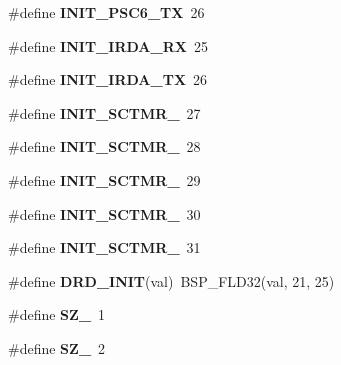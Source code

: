 \begin{DoxyCompactItemize}
\#define {\bfseries I\+N\+I\+T\+\_\+\+P\+S\+C6\+\_\+\+TX}~26
\item 
\mbox{\label{group__BestCommOps_ga1b7d0e7b2c654806151149a79e3caad8}} 
\#define {\bfseries I\+N\+I\+T\+\_\+\+I\+R\+D\+A\+\_\+\+RX}~25
\item 
\mbox{\label{group__BestCommOps_ga449182180851c69c13e8dadf65933df1}} 
\#define {\bfseries I\+N\+I\+T\+\_\+\+I\+R\+D\+A\+\_\+\+TX}~26
\item 
\mbox{\label{group__BestCommOps_gae946c01dce5b93d8088771439e62d155}} 
\#define {\bfseries I\+N\+I\+T\+\_\+\+S\+C\+T\+M\+R\+\_}~27
\item 
\mbox{\label{group__BestCommOps_ga1a8f367bdfd1d293a65e521a79c658a7}} 
\#define {\bfseries I\+N\+I\+T\+\_\+\+S\+C\+T\+M\+R\+\_}~28
\item 
\mbox{\label{group__BestCommOps_ga2acc0842b92361c1afe91c5da53f14bb}} 
\#define {\bfseries I\+N\+I\+T\+\_\+\+S\+C\+T\+M\+R\+\_}~29
\item 
\mbox{\label{group__BestCommOps_ga6198ea4a3709d7b712730549aed06d6a}} 
\#define {\bfseries I\+N\+I\+T\+\_\+\+S\+C\+T\+M\+R\+\_}~30
\item 
\mbox{\label{group__BestCommOps_gae0a9276387a675617acd63d9909db477}} 
\#define {\bfseries I\+N\+I\+T\+\_\+\+S\+C\+T\+M\+R\+\_}~31
\item 
\mbox{\label{group__BestCommOps_ga1dbac952a272a681cd461a71a1e0cbe3}} 
\#define {\bfseries D\+R\+D\+\_\+\+I\+N\+IT}(val)~B\+S\+P\+\_\+\+F\+L\+D32(val, 21, 25)
\item 
\mbox{\label{group__BestCommOps_gadaf9d43a91d76687b602684aeb514fd2}} 
\#define {\bfseries S\+Z\+\_}~1
\item 
\mbox{\label{group__BestCommOps_gadd2c65d71a1418808ad403f5208f8f8d}} 
\#define {\bfseries S\+Z\+\_}~2
\item 
\mbox{\label{group__BestCommOps_ga31ceba9b41d1018dce11c78a361f2231}} 

\end{DoxyCompactItemize}
